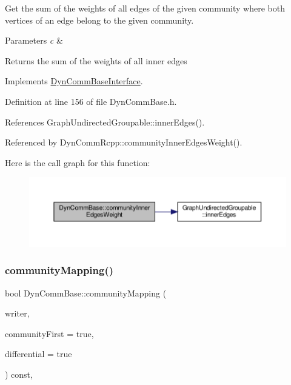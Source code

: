 Get the sum of the weights of all edges of the given community where both vertices of an edge belong to the given community.


\begin{DoxyParams}{Parameters}
{\em c} & \\
\hline
\end{DoxyParams}
\begin{DoxyReturn}{Returns}
the sum of the weights of all inner edges 
\end{DoxyReturn}


Implements \hyperlink{classDynCommBaseInterface_a0e68dcfcc55385ce60b000d76ccd2d86}{Dyn\+Comm\+Base\+Interface}.



Definition at line 156 of file Dyn\+Comm\+Base.\+h.



References Graph\+Undirected\+Groupable\+::inner\+Edges().



Referenced by Dyn\+Comm\+Rcpp\+::community\+Inner\+Edges\+Weight().

Here is the call graph for this function\+:
\nopagebreak
\begin{figure}[H]
\begin{center}
\leavevmode
\includegraphics[width=350pt]{classDynCommBase_ada91e7e914eb8be7f8c25f4c0c81156a_cgraph}
\end{center}
\end{figure}
\mbox{\label{classDynCommBase_a75ed5e0546d756a3b327f41e292620b2}} 
\subsubsection{\texorpdfstring{community\+Mapping()}{communityMapping()}}
{\footnotesize\ttfamily bool Dyn\+Comm\+Base\+::community\+Mapping (\begin{DoxyParamCaption}\item[{\hyperlink{classWriterInterface}{Writer\+Interface} $\ast$}]{writer,  }\item[{bool}]{community\+First = {\ttfamily true},  }\item[{bool}]{differential = {\ttfamily true} }\end{DoxyParamCaption}) const\hspace{0.3cm}{\ttfamily [inline]}, {\ttfamily [virtual]}}

